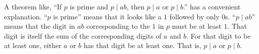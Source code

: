 \documentclass[12pt]{article}
\begin{document}
A theorem like, “If $p$ is prime and $p \mid ab$, then $p \mid a$ or $p \mid b$.” has a convenient explanation. “$p$ is prime” means that it looks like a $1$ followed by only $0$s. “$p \mid ab$” means that the digit in $ab$ corresponding to the $1$ in $p$ must be at least $1$. That digit is itself the sum of the corresponding digits of $a$ and $b$. For that digit to be at least one, either $a$ or $b$ has that digit be at least one. That is, $p \mid a$ or $p \mid b$.
\end{document}
